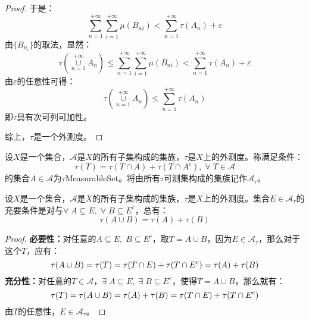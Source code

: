 \begin{proof}
	于是：
	\begin{equation*}
		\sum_{n=1}^{+\infty}\sum_{i=1}^{+\infty}\mu(B_{ni})<\sum_{n=1}^{+\infty}\tau(A_n)+\varepsilon
	\end{equation*}
	由$\{B_{n_i}\}$的取法，显然：
	\begin{equation*}
		\tau\left(\underset{n=1}{\overset{+\infty}{\cup}}A_n\right)\leqslant\sum_{n=1}^{+\infty}\sum_{i=1}^{+\infty}\mu(B_{ni})<\sum_{n=1}^{+\infty}\tau(A_n)+\varepsilon
	\end{equation*}
	由$\varepsilon$的任意性可得：
	\begin{equation*}
		\tau\left(\underset{n=1}{\overset{+\infty}{\cup}}A_n\right)\leqslant\sum_{n=1}^{+\infty}\tau(A_n)
	\end{equation*}
	即$\tau$具有次可列可加性。\par
	综上，$\tau$是一个外测度。
\end{proof}
\begin{definition}
	设$X$是一个集合，$\mathscr{A}$是$X$的所有子集构成的集族，$\tau$是$X$上的外测度。称满足条件：
	\begin{equation*}
		\tau(T)=\tau(T\cap A)+\tau(T\cap A^c),\;\forall\;T\in\mathscr{A}
	\end{equation*}
	的集合$A\in\mathscr{A}$为$\tau$\gls{MeasurableSet}。将由所有$\tau$可测集构成的集族记作$\mathscr{A}_{\tau}$。
\end{definition}
\begin{lemma}\label{lem:EmeasureAB}
	设$X$是一个集合，$\mathscr{A}$是$X$的所有子集构成的集族，$\tau$是$X$上的外测度。集合$E\in\mathscr{A}_{\tau}$的充要条件是对与$\forall\;A\subseteq E,\;\forall\;B\subseteq E^c$，总有：
	\begin{equation*}
		\tau(A\cup B)=\tau(A)+\tau(B)
	\end{equation*}
\end{lemma}
\begin{proof}
	\textbf{必要性：}对任意的$A\subseteq E,\;B\subseteq E^c$，取$T=A\cup B$，因为$E\in \mathscr{A}_{\tau}$，那么对于这个$T$，应有：
	\begin{equation}
		\tau(A\cup B)=\tau(T)=\tau(T\cap E)+\tau(T\cap E^c)=\tau(A)+\tau(B)\notag
	\end{equation}
	\textbf{充分性：}对任意的$T\in \mathscr{A}$，$\exists\;A\subseteq E,\;\exists\; B\subseteq E^c$，使得$T=A\cup B$，那么就有：
	\begin{equation}
		\tau(T)=\tau(A\cup B)=\tau(A)+\tau(B)=\tau(T\cap E)+\tau(T\cap E^c)\notag
	\end{equation}
	由$T$的任意性，$E\in \mathscr{A}_{\tau}$。
\end{proof}
